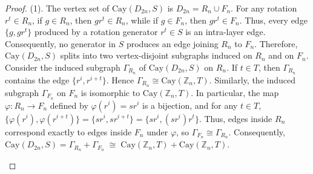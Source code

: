 \documentclass[12pt,reqno,a4paper]{amsart}
\theoremstyle{definition}
\begin{document}
\begin{proof}
(1). The vertex set of $\mathrm{Cay}(D_{2n}, S)$ is $D_{2n} = R_{n} \cup F_{n}$.  
For any rotation $r^t \in R_{n}$, 
if $g \in R_{n}$, then $g r^t \in R_{n}$, while if $g \in F_{n}$, then $g r^t \in F_{n}$.  
Thus, every edge $\{ g, g r^t \}$ produced by a rotation generator $r^{t}\in S$ is an intra-layer edge.  
Consequently, no generator in $S$ produces an edge joining $R_{n}$ to $F_{n}$.  
Therefore, $\mathrm{Cay}(D_{2n}, S)$ splits into two vertex-disjoint subgraphs induced on $R_{n}$ and on $F_{n}$.
Consider the induced subgraph $\Gamma_{R_{n}}$ of $\mathrm{Cay}(D_{2n}, S)$ on $R_{n}$.  
If $t \in T$, then $\Gamma_{R_{n}}$ contains the edge $\{ r^i, r^{i+t} \}$.  
Hence $\Gamma_{R_{n}}\cong\mathrm{Cay}(\mathbb{Z}_n, T)$.  
Similarly, the induced subgraph $\Gamma_{F_{n}}$ on $F_{n}$ is isomorphic to $\mathrm{Cay}(\mathbb{Z}_n, T)$.  
In particular, the map $\varphi : R_{n} \to F_{n}$ defined by $\varphi(r^i) = s r^i$ is a bijection, and for any $t \in T$,
$\{ \varphi(r^i), \varphi(r^{i+t}) \}
= \{ s r^i, s r^{i+t} \}
= \{ s r^i, (s r^i) r^t \}$.
Thus, edges inside $R_{n}$ correspond exactly to edges inside $F_{n}$ under $\varphi$, so $\Gamma_{F_{n}} \cong \Gamma_{R_{n}}$.  
Consequently,
$\mathrm{Cay}(D_{2n}, S)
= \Gamma_{R_{n}} + \Gamma_{F_{n}} 
\;\cong\;
\mathrm{Cay}(\mathbb{Z}_n, T) + \mathrm{Cay}(\mathbb{Z}_n, T)$.


\begin{figure}[h]
\centering
{}
\end{figure}
\end{proof}
\end{document}
